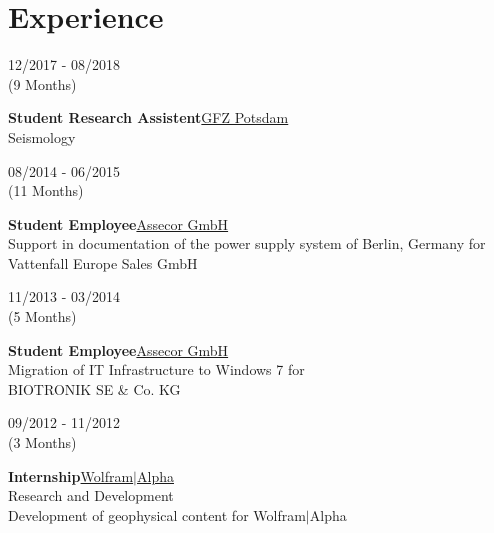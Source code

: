 \documentclass{article}
\begin{document}
\begin{minipage}[t]{0.7\textwidth}
		\section*{\fontsize{18pt}{24pt}\selectfont \color{pblue} Experience}
		
		\begin{minipage}[t]{0.3\textwidth}
		12/2017 - 08/2018\\ (9 Months)
		\end{minipage}
		\hfill
		\begin{minipage}[t]{0.7\textwidth}
		\textbf{Student Research Assistent}\hfill \href{https://gfz-potsdam.de/}{\color{pblue}GFZ Potsdam}\\
	    Seismology
		\end{minipage}\vspace{0.5cm}
		
		\begin{minipage}[t]{0.3\textwidth}
		08/2014 - 06/2015\\ (11 Months)
		\end{minipage}
		\hfill
		\begin{minipage}[t]{0.7\textwidth}
		\textbf{Student Employee}\hfill \href{https://assecor.de/}{\color{pblue}Assecor GmbH}\\
	    Support in documentation of the power supply system of Berlin, Germany for Vattenfall Europe Sales GmbH
		\end{minipage}\vspace{0.5cm}
		
		\begin{minipage}[t]{0.3\textwidth}
		11/2013 - 03/2014 \\ (5 Months)
		\end{minipage}
		\hfill
		\begin{minipage}[t]{0.7\textwidth}
		\textbf{Student Employee}\hfill \href{https://assecor.de/}{\color{pblue}Assecor GmbH}\\
	    Migration of IT Infrastructure to Windows 7 for\\ BIOTRONIK SE \& Co. KG
		\end{minipage}\vspace{0.5cm}

		\begin{minipage}[t]{0.3\textwidth}
		09/2012 - 11/2012 \\ (3 Months)
		\end{minipage}		
		\hfill
		\begin{minipage}[t]{0.7\textwidth}
		\textbf{Internship}\hfill \href{https:///www.wolframalpha.com/}{\color{pblue}Wolfram$\mid$Alpha}\\
	    Research and Development\\
	    Development of geophysical content for Wolfram$\mid$Alpha
		\end{minipage}\vspace{0.5cm}
		

\end{minipage}
\end{document}
